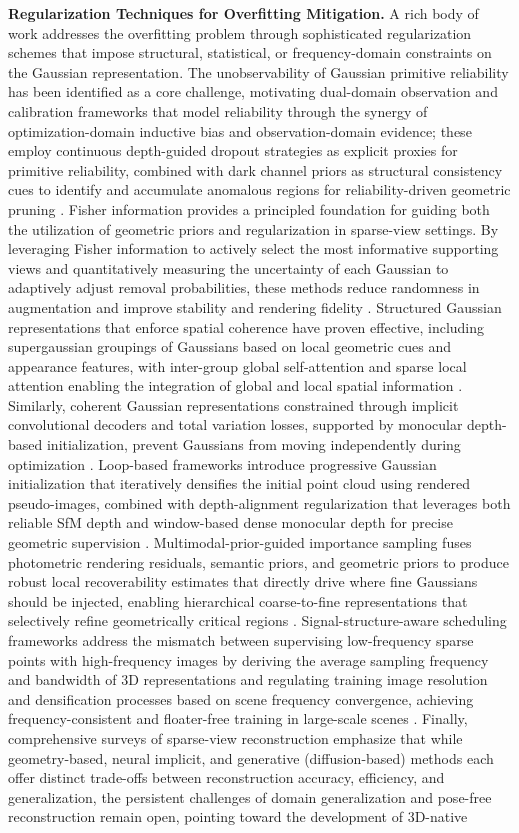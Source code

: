 \documentclass[11pt]{article}
\begin{document}
\textbf{Regularization Techniques for Overfitting Mitigation.} A rich body of work addresses the overfitting problem through sophisticated regularization schemes that impose structural, statistical, or frequency-domain constraints on the Gaussian representation. The unobservability of Gaussian primitive reliability has been identified as a core challenge, motivating dual-domain observation and calibration frameworks that model reliability through the synergy of optimization-domain inductive bias and observation-domain evidence; these employ continuous depth-guided dropout strategies as explicit proxies for primitive reliability, combined with dark channel priors as structural consistency cues to identify and accumulate anomalous regions for reliability-driven geometric pruning \cite{ref177}. Fisher information provides a principled foundation for guiding both the utilization of geometric priors and regularization in sparse-view settings. By leveraging Fisher information to actively select the most informative supporting views and quantitatively measuring the uncertainty of each Gaussian to adaptively adjust removal probabilities, these methods reduce randomness in augmentation and improve stability and rendering fidelity \cite{ref178}. Structured Gaussian representations that enforce spatial coherence have proven effective, including supergaussian groupings of Gaussians based on local geometric cues and appearance features, with inter-group global self-attention and sparse local attention enabling the integration of global and local spatial information \cite{ref267}. Similarly, coherent Gaussian representations constrained through implicit convolutional decoders and total variation losses, supported by monocular depth-based initialization, prevent Gaussians from moving independently during optimization \cite{ref268}. Loop-based frameworks introduce progressive Gaussian initialization that iteratively densifies the initial point cloud using rendered pseudo-images, combined with depth-alignment regularization that leverages both reliable SfM depth and window-based dense monocular depth for precise geometric supervision \cite{ref269}. Multimodal-prior-guided importance sampling fuses photometric rendering residuals, semantic priors, and geometric priors to produce robust local recoverability estimates that directly drive where fine Gaussians should be injected, enabling hierarchical coarse-to-fine representations that selectively refine geometrically critical regions \cite{ref270}. Signal-structure-aware scheduling frameworks address the mismatch between supervising low-frequency sparse points with high-frequency images by deriving the average sampling frequency and bandwidth of 3D representations and regulating training image resolution and densification processes based on scene frequency convergence, achieving frequency-consistent and floater-free training in large-scale scenes \cite{ref140}. Finally, comprehensive surveys of sparse-view reconstruction emphasize that while geometry-based, neural implicit, and generative (diffusion-based) methods each offer distinct trade-offs between reconstruction accuracy, efficiency, and generalization, the persistent challenges of domain generalization and pose-free reconstruction remain open, pointing toward the development of 3D-native 
\end{document}
